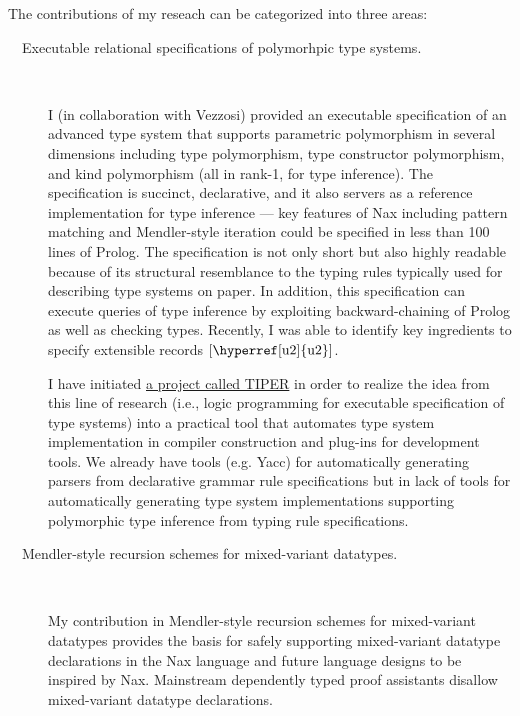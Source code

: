 \documentclass[11pt,letterpaper]{article}
\begin{document}
The contributions of my reseach can be categorized into three areas:
\begin{description}
\item[~~Executable relational specifications of polymorhpic type systems.]~

\hspace*{1ex}
I (in collaboration with Vezzosi) provided an executable specification
\cite{AhnVez16} of an advanced type system that supports
parametric polymorphism in several dimensions including type polymorphism,
type constructor polymorphism, and kind polymorphism (all in rank-1, for type
inference). The specification is succinct, declarative, and it also servers
as a reference implementation for type inference --- key features of Nax
including pattern matching and Mendler-style iteration could be specified
in less than 100 lines of Prolog. The specification is not only short
but also highly readable because of its structural resemblance to
the typing rules typically used for describing type systems on paper.
In addition, this specification can execute queries of type inference
by exploiting backward-chaining of Prolog as well as checking types.
Recently, I was able to identify key ingredients to specify
extensible records  $[\text{\hyperref[u2]{u2}}]$.

\hspace*{1ex}
I have initiated \href{http://kyagrd.github.com/tiper/}{a project called TIPER}
in order to realize the idea from this line of research (i.e., logic programming
for executable specification of type systems) into a practical tool
that automates type system implementation in compiler construction and
plug-ins for development tools. We already have tools  (e.g. Yacc) for
automatically generating parsers from declarative grammar rule specifications
but in lack of tools for automatically generating type system implementations
supporting polymorphic type inference from typing rule specifications.


\item[~~Mendler-style recursion schemes for mixed-variant datatypes.]~

\hspace*{1ex}
My contribution in Mendler-style recursion schemes for mixed-variant datatypes
provides the basis for safely supporting mixed-variant datatype declarations
in the Nax language and future language designs to be inspired by Nax.
Mainstream dependently typed proof assistants disallow
mixed-variant datatype declarations.


\end{description}
\end{document}
